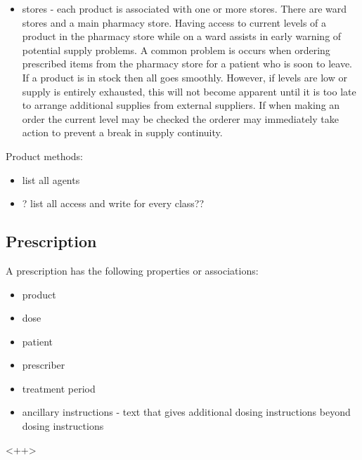 \documentclass[letterpaper]{amsart}
\begin{document}
\begin{itemize}
    \item stores - each product is associated with one or more stores.  There are ward stores and a main pharmacy store.  Having access to current levels of a product in the pharmacy store while on a ward assists in early warning of potential supply problems.  A common problem is occurs when ordering prescribed items from the pharmacy store for a patient who is soon to leave.  If a product is in stock then all goes smoothly.  However, if levels are low or supply is entirely exhausted, this will not become apparent until it is too late to arrange additional supplies from external suppliers.  If when making an order the current level may be checked the orderer may immediately take action to prevent a break in supply continuity.  
\end{itemize}

Product methods:\\ 
\begin{itemize}
    \item list all agents 
    \item ? list all access and write for every class??
\end{itemize}
\subsection{Prescription}
A prescription has the following properties or associations:
\begin{itemize}
    \item product 
    \item dose 
    \item patient 
    \item prescriber 
    \item treatment period 
    \item ancillary instructions - text that gives additional dosing instructions beyond dosing instructions
\end{itemize}<++>
\end{document}
